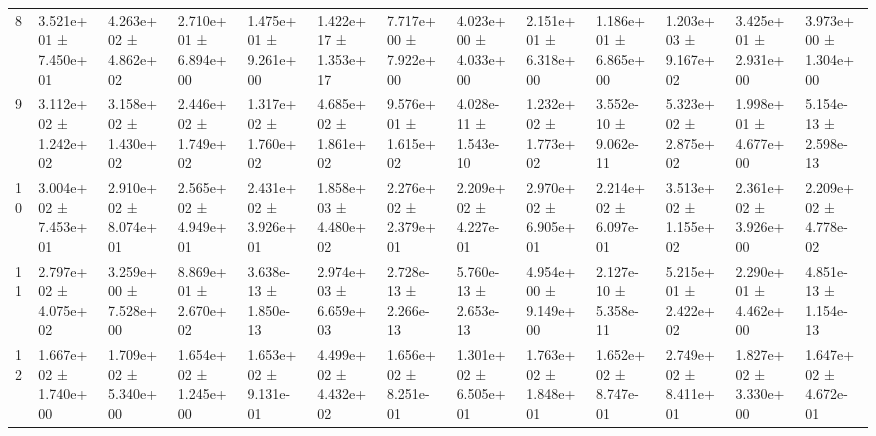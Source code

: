 \begin{table}
\begin{tabular}{lllllllllllll}
8 & 3.521e+01 ± 7.450e+01 & 4.263e+02 ± 4.862e+02 & 2.710e+01 ± 6.894e+00 & 1.475e+01 ± 9.261e+00 & 1.422e+17 ± 1.353e+17 & 7.717e+00 ± 7.922e+00 & 4.023e+00 ± 4.033e+00 & 2.151e+01 ± 6.318e+00 & 1.186e+01 ± 6.865e+00 & 1.203e+03 ± 9.167e+02 & 3.425e+01 ± 2.931e+00 & 3.973e+00 ± 1.304e+00 \\
9 & 3.112e+02 ± 1.242e+02 & 3.158e+02 ± 1.430e+02 & 2.446e+02 ± 1.749e+02 & 1.317e+02 ± 1.760e+02 & 4.685e+02 ± 1.861e+02 & 9.576e+01 ± 1.615e+02 & 4.028e-11 ± 1.543e-10 & 1.232e+02 ± 1.773e+02 & 3.552e-10 ± 9.062e-11 & 5.323e+02 ± 2.875e+02 & 1.998e+01 ± 4.677e+00 & 5.154e-13 ± 2.598e-13 \\
10 & 3.004e+02 ± 7.453e+01 & 2.910e+02 ± 8.074e+01 & 2.565e+02 ± 4.949e+01 & 2.431e+02 ± 3.926e+01 & 1.858e+03 ± 4.480e+02 & 2.276e+02 ± 2.379e+01 & 2.209e+02 ± 4.227e-01 & 2.970e+02 ± 6.905e+01 & 2.214e+02 ± 6.097e-01 & 3.513e+02 ± 1.155e+02 & 2.361e+02 ± 3.926e+00 & 2.209e+02 ± 4.778e-02 \\
11 & 2.797e+02 ± 4.075e+02 & 3.259e+00 ± 7.528e+00 & 8.869e+01 ± 2.670e+02 & 3.638e-13 ± 1.850e-13 & 2.974e+03 ± 6.659e+03 & 2.728e-13 ± 2.266e-13 & 5.760e-13 ± 2.653e-13 & 4.954e+00 ± 9.149e+00 & 2.127e-10 ± 5.358e-11 & 5.215e+01 ± 2.422e+02 & 2.290e+01 ± 4.462e+00 & 4.851e-13 ± 1.154e-13 \\
12 & 1.667e+02 ± 1.740e+00 & 1.709e+02 ± 5.340e+00 & 1.654e+02 ± 1.245e+00 & 1.653e+02 ± 9.131e-01 & 4.499e+02 ± 4.432e+02 & 1.656e+02 ± 8.251e-01 & 1.301e+02 ± 6.505e+01 & 1.763e+02 ± 1.848e+01 & 1.652e+02 ± 8.747e-01 & 2.749e+02 ± 8.411e+01 & 1.827e+02 ± 3.330e+00 & 1.647e+02 ± 4.672e-01 \\
\bottomrule
\end{tabular}
\end{table}
